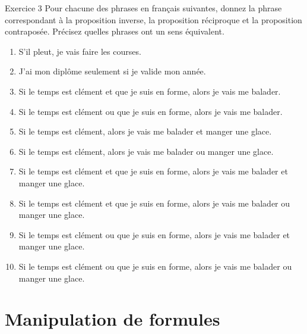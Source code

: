 \documentclass[a4paper,11pt]{article}
\begin{document}
\begin{exercisebox}{Exercice 3}
Pour chacune des phrases en français suivantes, donnez la phrase correspondant à la proposition inverse, la proposition réciproque et la proposition contraposée. Précisez quelles phrases ont un sens équivalent.

\begin{enumerate}
    \item S'il pleut, je vais faire les courses.
    \item J'ai mon diplôme seulement si je valide mon année.
    \item Si le temps est clément et que je suis en forme, alors je vais me balader.
    \item Si le temps est clément ou que je suis en forme, alors je vais me balader.
    \item Si le temps est clément, alors je vais me balader et manger une glace.
    \item Si le temps est clément, alors je vais me balader ou manger une glace.
    \item Si le temps est clément et que je suis en forme, alors je vais me balader et manger une glace.
    \item Si le temps est clément et que je suis en forme, alors je vais me balader ou manger une glace.
    \item Si le temps est clément ou que je suis en forme, alors je vais me balader et manger une glace.
    \item Si le temps est clément ou que je suis en forme, alors je vais me balader ou manger une glace.
\end{enumerate}
\end{exercisebox}

\section{Manipulation de formules}
\end{document}
